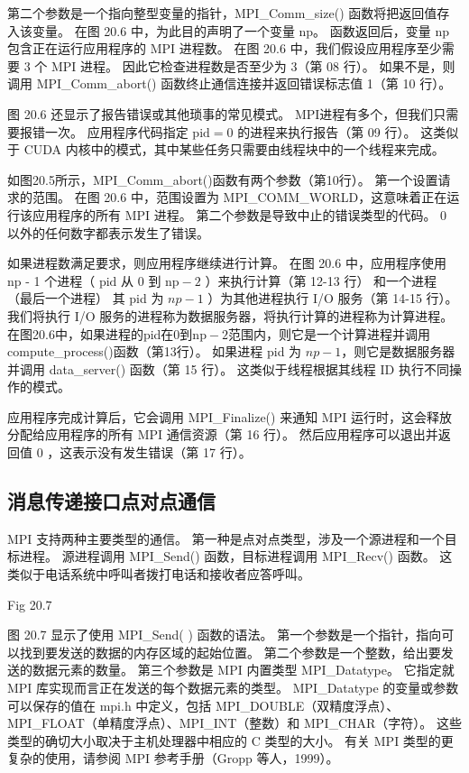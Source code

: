 第二个参数是一个指向整型变量的指针，MPI\_Comm\_size() 函数将把返回值存入该变量。 
在图 20.6 中，为此目的声明了一个变量 np。 函数返回后，变量 np 包含正在运行应用程序的 MPI 进程数。 
在图 20.6 中，我们假设应用程序至少需要 3 个 MPI 进程。 因此它检查进程数是否至少为 3（第 08 行）。 
如果不是，则调用 MPI\_Comm\_abort() 函数终止通信连接并返回错误标志值 1（第 10 行）。

图 20.6 还显示了报告错误或其他琐事的常见模式。 MPI进程有多个，但我们只需要报错一次。 
应用程序代码指定 $\mathrm{pid}=0$ 的进程来执行报告（第 09 行）。 
这类似于 CUDA 内核中的模式，其中某些任务只需要由线程块中的一个线程来完成。

如图20.5所示，MPI\_Comm\_abort()函数有两个参数（第10行）。 第一个设置请求的范围。 
在图 20.6 中，范围设置为 MPI\_COMM\_WORLD，这意味着正在运行该应用程序的所有 MPI 进程。 
第二个参数是导致中止的错误类型的代码。 0 以外的任何数字都表示发生了错误。

如果进程数满足要求，则应用程序继续进行计算。 
在图 20.6 中，应用程序使用 np - 1 个进程（ $\mathrm{pid}$ 从 0 到 $\mathrm{np}-2$ ）来执行计算（第 12-13 行）
和一个进程（最后一个进程） 其 pid 为 $n p-1$ ）为其他进程执行 I/O 服务（第 14-15 行）。 
我们将执行 I/O 服务的进程称为数据服务器，将执行计算的进程称为计算进程。 
在图20.6中，如果进程的pid在0到$\mathrm{np}-2$范围内，则它是一个计算进程并调用compute\_process()函数（第13行）。 
如果进程 pid 为 $n p-1$，则它是数据服务器并调用 data\_server() 函数（第 15 行）。 
这类似于线程根据其线程 ID 执行不同操作的模式。

应用程序完成计算后，它会调用 MPI\_Finalize() 来通知 MPI 运行时，这会释放分配给应用程序的所有 MPI 通信资源（第 16 行）。 
然后应用程序可以退出并返回值 0 ，这表示没有发生错误（第 17 行）。

\subsection{消息传递接口点对点通信}
MPI 支持两种主要类型的通信。 第一种是点对点类型，涉及一个源进程和一个目标进程。 
源进程调用 MPI\_Send() 函数，目标进程调用 MPI\_Recv() 函数。 这类似于电话系统中呼叫者拨打电话和接收者应答呼叫。

{\color{red} Fig 20.7}

图 20.7 显示了使用 MPI\_Send( ) 函数的语法。 第一个参数是一个指针，指向可以找到要发送的数据的内存区域的起始位置。 
第二个参数是一个整数，给出要发送的数据元素的数量。 第三个参数是 MPI 内置类型 MPI\_Datatype。 
它指定就 MPI 库实现而言正在发送的每个数据元素的类型。 
MPI\_Datatype 的变量或参数可以保存的值在 mpi.h 中定义，包括 MPI\_DOUBLE（双精度浮点）、
MPI\_FLOAT（单精度浮点）、MPI\_INT（整数）和 MPI\_CHAR（字符）。 
这些类型的确切大小取决于主机处理器中相应的 $\mathrm{C}$ 类型的大小。 
有关 MPI 类型的更复杂的使用，请参阅 MPI 参考手册（Gropp 等人，1999）。

